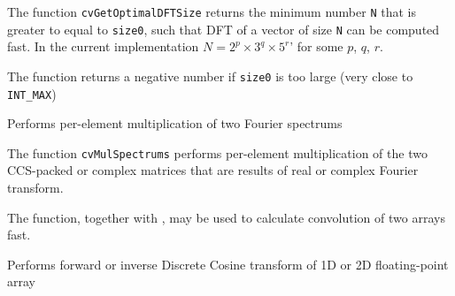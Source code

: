 \begin{description}
\end{description}


The function \texttt{cvGetOptimalDFTSize} returns the minimum number
\texttt{N} that is greater to equal to \texttt{size0}, such that DFT
of a vector of size \texttt{N} can be computed fast. In the current
implementation $N=2^p \times 3^q \times 5^r$' for some $p$, $q$, $r$.

The function returns a negative number if \texttt{size0} is too large
(very close to \texttt{INT\_MAX})


\label{MulSpectrums}

Performs per-element multiplication of two Fourier spectrums


\begin{description}

\end{description}

The function \texttt{cvMulSpectrums} performs per-element multiplication of the two CCS-packed or complex matrices that are results of real or complex Fourier transform.

The function, together with , may be used to calculate convolution of two arrays fast.


\label{DCT}

Performs forward or inverse Discrete Cosine transform of 1D or 2D floating-point array



